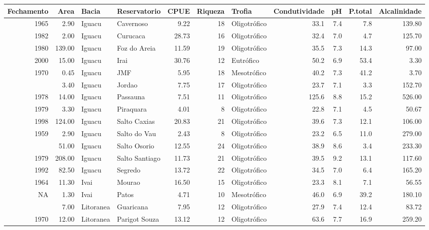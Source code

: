 \documentclass[
]{book}
\begin{document}
\begin{table}
\centering\begingroup\fontsize{8}{10}\selectfont

\begin{tabular}{rrllrrlrrrr}
\toprule
Fechamento & Area & Bacia & Reservatorio & CPUE & Riqueza & Trofia & Condutividade & pH & P.total & Alcalinidade\\
\midrule
1965 & 2.90 & Iguacu & Cavernoso & 9.22 & 18 & Oligotrófico & 33.1 & 7.4 & 7.8 & 139.80\\
1982 & 2.00 & Iguacu & Curucaca & 28.73 & 16 & Oligotrófico & 32.4 & 7.0 & 4.7 & 125.70\\
1980 & 139.00 & Iguacu & Foz do Areia & 11.59 & 19 & Oligotrófico & 35.5 & 7.3 & 14.3 & 97.00\\
2000 & 15.00 & Iguacu & Irai & 30.76 & 12 & Eutrófico & 50.2 & 6.9 & 53.4 & 3.30\\
1970 & 0.45 & Iguacu & JMF & 5.95 & 18 & Mesotrófico & 40.2 & 7.3 & 41.2 & 3.70\\
\addlinespace
1996 & 3.40 & Iguacu & Jordao & 7.75 & 17 & Oligotrófico & 23.7 & 7.1 & 3.3 & 152.70\\
1978 & 14.00 & Iguacu & Passauna & 7.51 & 11 & Oligotrófico & 125.6 & 8.8 & 15.2 & 526.00\\
1979 & 3.30 & Iguacu & Piraquara & 4.01 & 8 & Oligotrófico & 22.8 & 7.1 & 4.5 & 50.67\\
1998 & 124.00 & Iguacu & Salto Caxias & 20.83 & 21 & Oligotrófico & 39.6 & 7.3 & 12.1 & 106.00\\
1959 & 2.90 & Iguacu & Salto do Vau & 2.43 & 8 & Oligotrófico & 23.2 & 6.5 & 11.0 & 279.00\\
\addlinespace
1975 & 51.00 & Iguacu & Salto Osorio & 12.55 & 24 & Oligotrófico & 38.9 & 8.6 & 3.4 & 233.30\\
1979 & 208.00 & Iguacu & Salto Santiago & 11.73 & 21 & Oligotrófico & 39.5 & 9.2 & 13.1 & 117.60\\
1992 & 82.50 & Iguacu & Segredo & 13.72 & 22 & Oligotrófico & 34.5 & 7.0 & 6.4 & 165.20\\
1964 & 11.30 & Ivai & Mourao & 16.50 & 15 & Oligotrófico & 23.3 & 8.1 & 7.1 & 56.55\\
NA & 1.30 & Ivai & Patos & 4.71 & 10 & Mesotrófico & 46.0 & 6.9 & 39.2 & 180.10\\
\addlinespace
1957 & 7.00 & Litoranea & Guaricana & 7.95 & 12 & Oligotrófico & 27.9 & 7.4 & 12.4 & 83.72\\
1970 & 12.00 & Litoranea & Parigot Souza & 13.12 & 12 & Oligotrófico & 63.6 & 7.7 & 16.9 & 259.20\\

\end{tabular}
\end{table}
\end{document}
